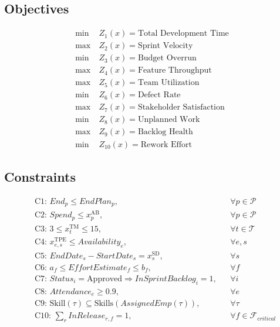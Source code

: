 \documentclass{article}
\begin{document}
\subsection*{Objectives}
\begin{subequations}
\begin{align}
\min\ & Z_1(x)=\text{Total Development Time}\\
\max\ & Z_2(x)=\text{Sprint Velocity}\\
\min\ & Z_3(x)=\text{Budget Overrun}\\
\max\ & Z_4(x)=\text{Feature Throughput}\\
\max\ & Z_5(x)=\text{Team Utilization}\\
\min\ & Z_6(x)=\text{Defect Rate}\\
\max\ & Z_7(x)=\text{Stakeholder Satisfaction}\\
\min\ & Z_8(x)=\text{Unplanned Work}\\
\max\ & Z_9(x)=\text{Backlog Health}\\
\min\ & Z_{10}(x)=\text{Rework Effort}
\end{align}
\end{subequations}

\subsection*{Constraints}
\begin{align}
& \text{C1: } End_p \le EndPlan_p, && \forall p\in\mathcal{P}\\
& \text{C2: } Spend_p \le x_{p}^{\mathrm{AB}}, && \forall p\in\mathcal{P}\\
& \text{C3: } 3\le x_{t}^{\mathrm{TM}}\le15, && \forall t\in\mathcal{T}\\
& \text{C4: } x_{e,s}^{\mathrm{TPE}} \le Availability_e, && \forall e,s\\
& \text{C5: } EndDate_s - StartDate_s = x_{s}^{\mathrm{SD}}, && \forall s\\
& \text{C6: } a_f \le EffortEstimate_f \le b_f, && \forall f\\
& \text{C7: } Status_i=\text{Approved} \Rightarrow InSprintBacklog_i=1, && \forall i\\
& \text{C8: } Attendance_e \ge 0.9, && \forall e\\
& \text{C9: } \text{Skill}(\tau) \subseteq \text{Skills}(AssignedEmp(\tau)), && \forall \tau\\
& \text{C10: } \sum_{r} InRelease_{r,f} =1, && \forall f \in \mathcal{F}_{critical}
\end{align}
\end{document}
